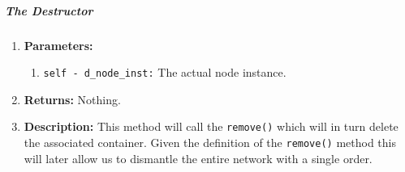         \subparagraph{The Destructor}
            \begin{enumerate}
                \item \textbf{Parameters:}
                \begin{enumerate}
                    \item \texttt{self - d\_node\_inst:} The actual node instance.
                \end{enumerate}
                \item \textbf{Returns:} Nothing.
                \item \textbf{Description:} This method will call the \texttt{remove()} which will in turn delete the associated container. Given the definition of the \texttt{remove()} method this will later allow us to dismantle the entire network with a single order.
            \end{enumerate}
